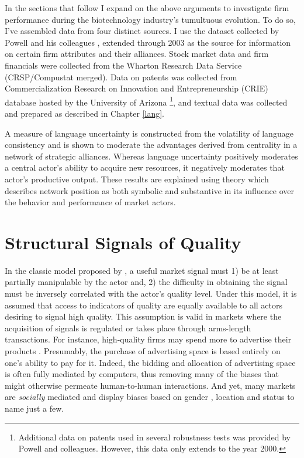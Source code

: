 In the sections that follow I expand on the above arguments to investigate firm performance during the biotechnology industry's tumultuous evolution. To do so, I've assembled data from four distinct sources. I use the dataset collected by Powell and his colleagues \citep[see][]{powell2005, powell1996}, extended through 2003 as the source for information on certain firm attributes and their alliances. Stock market data and firm financials were collected from the Wharton Research Data Service (CRSP/Compustat merged). Data on patents was collected from Commercialization Research on Innovation and Entrepreneurship (CRIE) database hosted by the University of Arizona \footnote{Additional data on patents used in several robustness tests was provided by Powell and colleagues. However, this data only extends to the year 2000.}, and textual data was collected and prepared as described in Chapter \ref{lang}. 

A measure of language uncertainty is constructed from the volatility of language consistency and is shown to moderate the advantages derived from centrality in a network of strategic alliances. Whereas language uncertainty positively moderates a central actor's ability to acquire new resources, it negatively moderates that actor's productive output. These results are explained using theory which describes network position as both symbolic and substantive in its influence over the behavior and performance of market actors.

\section{Structural Signals of Quality \label{sig_qual}}

In the classic model proposed by \citet{spence1973}, a useful market signal must 1) be at least partially manipulable by the actor and, 2) the difficulty in obtaining the signal must be inversely correlated with the actor's quality level. Under this model, it is assumed that access to indicators of quality are equally available to all actors desiring to signal high quality. This assumption is valid in markets where the acquisition of signals is regulated or takes place through arms-length transactions. For instance, high-quality firms may spend more to advertise their products \citep{kirmani2000}. Presumably, the purchase of advertising space is based entirely on one's ability to pay for it. Indeed, the bidding and allocation of advertising space is often fully mediated by computers, thus removing many of the biases that might otherwise permeate human-to-human interactions. And yet, many markets are \emph{socially} mediated and display biases based on gender \citep{koput2010}, location \citep{owen2004} and status \citep{kim2014} to name just a few. 

